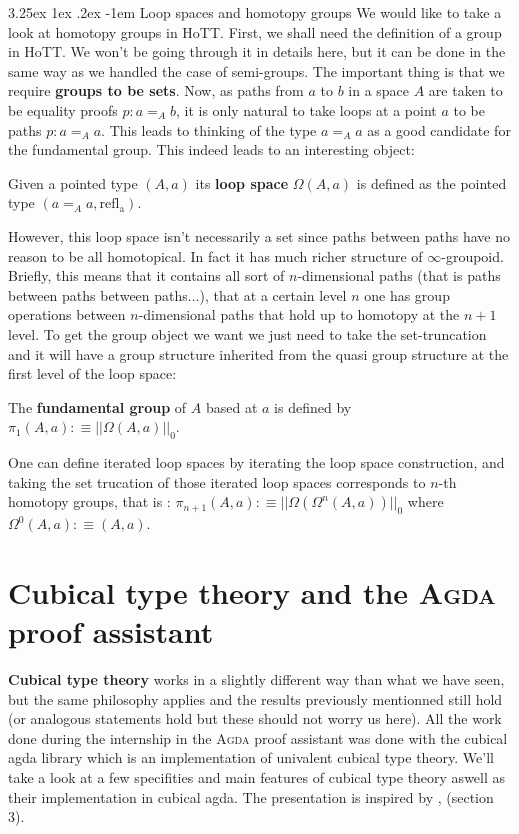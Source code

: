 \documentclass{report}
\makeatletter
\renewcommand\paragraph{\@startsection{paragraph}{5}{\z@}%
  {3.25ex \@plus1ex \@minus.2ex}%
  {-1em}%
  {\normalfont\normalsize\bfseries}}
\makeatother
\begin{document}
\paragraph{Loop spaces and homotopy groups} We would like to take a look at homotopy groups in HoTT. First, we shall need the definition of a group in HoTT. We won't be going through it in details here, but it can be done in the same way as we handled the case of semi-groups. The important thing is that we require \textbf{groups to be sets}. Now, as paths from $a$ to $b$ in a space $A$ are taken to be equality proofs $p :a=_A b$, it is only natural to take loops at a point $a$ to be paths $p : a=_A a$. This leads to thinking of the type $a=_A a$ as a good candidate for the fundamental group. This indeed leads to an interesting object:
\begin{mydef}
  Given a pointed type $(A,a)$ its \textbf{loop space} $\Omega(A,a)$ is defined as the pointed type $(a=_Aa,\mathrm{refl_a})$. 
\end{mydef}
However, this loop space isn't necessarily a set since paths between paths have no reason to be all homotopical. In fact it has much richer structure of $\infty$-groupoid. Briefly, this means that it contains all sort of $n$-dimensional paths (that is paths between paths between paths...), that at a certain level $n$ one has group operations between $n$-dimensional paths that hold up to homotopy at the $n+1$ level. To get the group object we want we just need to take the set-truncation and it will have a group structure inherited from the quasi group structure at the first level of the loop space:
\begin{mydef}
  The \textbf{fundamental group} of $A$ based at $a$ is defined by $\pi_1(A,a) :\equiv ||\Omega(A,a)||_0$.
\end{mydef}
One can define iterated loop spaces by iterating the loop space construction, and taking the set trucation of those iterated loop spaces corresponds to $n$-th homotopy groups, that is : $\pi_{n+1}(A,a) :\equiv ||\Omega(\Omega^n(A,a))||_0$ where $\Omega^0(A,a):\equiv (A,a)$.
\section{Cubical type theory and the \textsc{Agda} proof assistant}
\textbf{Cubical type theory} works in a slightly different way than what we have seen, but the same philosophy applies and the results previously mentionned still hold (or analogous statements hold but these should not worry us here). All the work done during the internship in the \textsc{Agda} proof assistant was done with the cubical agda library \cite{cubicalagda} which is an implementation of univalent cubical type theory. We'll take a look at a few specifities and main features of cubical type theory aswell as their implementation in cubical agda. The presentation is inspired by \cite{CubAgdaDoc} , \cite{CubTT} (section 3).
\end{document}
